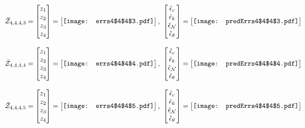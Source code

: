 \documentclass[12pt]{article}
\begin{document}
\begin{gather*}
\bar{\mathcal{Z}}_{4,4,4,3}=\begin{bmatrix}
z_1\\
z_2\\
z_3\\
z_4
 \end{bmatrix}= \begin{bmatrix}
\vcenter{\hbox{\texttt{[image: errs4\$4\$4\$3.pdf]}}}
 \end{bmatrix},\,\, \begin{bmatrix}
\hat{\epsilon}_c\\\hat{\epsilon}_k\\\hat{\epsilon}_\mathcal{N}\\\hat{\epsilon}_\theta
 \end{bmatrix}=\begin{bmatrix}
\vcenter{\hbox{\texttt{[image: predErrs4\$4\$4\$3.pdf]}}}
 \end{bmatrix}
\end{gather*}


\begin{gather*}
\bar{\mathcal{Z}}_{4,4,4,4}=\begin{bmatrix}
z_1\\
z_2\\
z_3\\
z_4
 \end{bmatrix}= \begin{bmatrix}
\vcenter{\hbox{\texttt{[image: errs4\$4\$4\$4.pdf]}}}
 \end{bmatrix},\,\, \begin{bmatrix}
\hat{\epsilon}_c\\\hat{\epsilon}_k\\\hat{\epsilon}_\mathcal{N}\\\hat{\epsilon}_\theta
 \end{bmatrix}=\begin{bmatrix}
\vcenter{\hbox{\texttt{[image: predErrs4\$4\$4\$4.pdf]}}}
 \end{bmatrix}
\end{gather*}

\begin{gather*}
\bar{\mathcal{Z}}_{4,4,4,5}=\begin{bmatrix}
z_1\\
z_2\\
z_3\\
z_4
 \end{bmatrix}= \begin{bmatrix}
\vcenter{\hbox{\texttt{[image: errs4\$4\$4\$5.pdf]}}}
 \end{bmatrix},\,\, \begin{bmatrix}
\hat{\epsilon}_c\\\hat{\epsilon}_k\\\hat{\epsilon}_\mathcal{N}\\\hat{\epsilon}_\theta
 \end{bmatrix}=\begin{bmatrix}
\vcenter{\hbox{\texttt{[image: predErrs4\$4\$4\$5.pdf]}}}
 \end{bmatrix}
\end{gather*}
\end{document}
